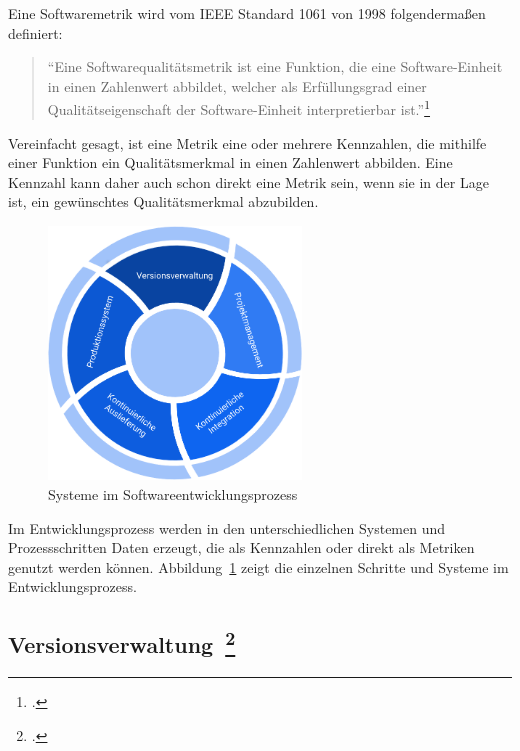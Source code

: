 Eine Softwaremetrik wird vom \ac{IEEE} Standard 1061 von 1998 folgendermaßen definiert:
\begin{quote}
  ``Eine Softwarequalitätsmetrik ist eine Funktion, die eine Software-Einheit in einen Zahlenwert abbildet, welcher als Erfüllungsgrad einer Qualitätseigenschaft der Software-Einheit interpretierbar ist.''\footcite[vgl.][S.3]{ieee-1061}
\end{quote}

Vereinfacht gesagt, ist eine Metrik eine oder mehrere Kennzahlen, die mithilfe einer Funktion ein Qualitätsmerkmal in einen Zahlenwert abbilden.
Eine Kennzahl kann daher auch schon direkt eine Metrik sein, wenn sie in der Lage ist, ein gewünschtes Qualitätsmerkmal abzubilden.

\begin{savenotes}
  \begin{figure}[H] 
    \centering
       \includegraphics[width=0.6\textwidth]{img/software-development-lifecycle.png}
    \caption[Systeme im Softwareentwicklungsprozess]{Systeme im Softwareentwicklungsprozess~\label{fig:sdlc}}
  \end{figure}
\end{savenotes}

Im Entwicklungsprozess werden in den unterschiedlichen Systemen und Prozessschritten Daten erzeugt, die als Kennzahlen oder direkt als Metriken genutzt werden können.
Abbildung~\ref{fig:sdlc} zeigt die einzelnen Schritte und Systeme im Entwicklungsprozess.

\newpage
\subsection[Versionsverwaltung]{Versionsverwaltung~\footcite[vgl.][S.62ff]{davis_agile_2015}}

